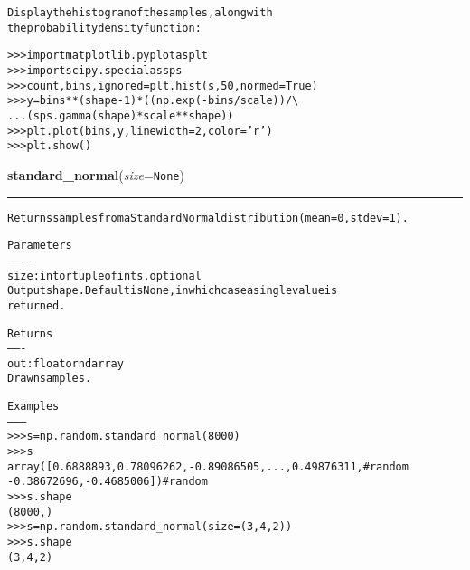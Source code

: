 \begin{boxedminipage}{\funcwidth}
\begin{alltt}
Display the histogram of the samples, along with
the probability density function:

{\textgreater}{\textgreater}{\textgreater} import matplotlib.pyplot as plt
{\textgreater}{\textgreater}{\textgreater} import scipy.special as sps
{\textgreater}{\textgreater}{\textgreater} count, bins, ignored = plt.hist(s, 50, normed=True)
{\textgreater}{\textgreater}{\textgreater} y = bins**(shape-1) * ((np.exp(-bins/scale))/ {\textbackslash}
...                       (sps.gamma(shape) * scale**shape))
{\textgreater}{\textgreater}{\textgreater} plt.plot(bins, y, linewidth=2, color='r')
{\textgreater}{\textgreater}{\textgreater} plt.show()
\end{alltt}

\setlength{\parskip}{1ex}
    \end{boxedminipage}

    \label{trunk:qstkutil:bollinger:standard_normal}

    \vspace{0.5ex}

\hspace{.8\funcindent}\begin{boxedminipage}{\funcwidth}

    \raggedright \textbf{standard\_normal}(\textit{size}={\tt None})

    \vspace{-1.5ex}

    \rule{\textwidth}{0.5\fboxrule}
\setlength{\parskip}{2ex}
\begin{alltt}
Returns samples from a Standard Normal distribution (mean=0, stdev=1).

Parameters
----------
size : int or tuple of ints, optional
    Output shape. Default is None, in which case a single value is
    returned.

Returns
-------
out : float or ndarray
    Drawn samples.

Examples
--------
{\textgreater}{\textgreater}{\textgreater} s = np.random.standard\_normal(8000)
{\textgreater}{\textgreater}{\textgreater} s
array([ 0.6888893 ,  0.78096262, -0.89086505, ...,  0.49876311, \#random
       -0.38672696, -0.4685006 ])                               \#random
{\textgreater}{\textgreater}{\textgreater} s.shape
(8000,)
{\textgreater}{\textgreater}{\textgreater} s = np.random.standard\_normal(size=(3, 4, 2))
{\textgreater}{\textgreater}{\textgreater} s.shape
(3, 4, 2)
\end{alltt}

\setlength{\parskip}{1ex}
    \end{boxedminipage}

